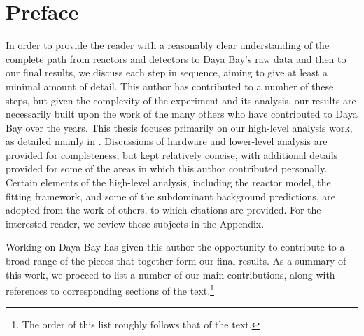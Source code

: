 \chapter*{Preface}

In order to provide the reader with a reasonably clear understanding of the complete path from reactors and detectors to Daya Bay's raw data and then to our final results, we discuss each step in sequence, aiming to give at least a minimal amount of detail. This author has contributed to a number of these steps, but given the complexity of the experiment and its analysis, our results are necessarily built upon the work of the many others who have contributed to Daya Bay over the years. This thesis focuses primarily on our high-level analysis work, as detailed mainly in . Discussions of hardware and lower-level analysis are provided for completeness, but kept relatively concise, with additional details provided for some of the areas in which this author contributed personally. Certain elements of the high-level analysis, including the reactor model, the fitting framework, and some of the subdominant background predictions, are adopted from the work of others, to which citations are provided. For the interested reader, we review these subjects in the Appendix.


Working on Daya Bay has given this author the opportunity to contribute to a broad range of the pieces that together form our final results. As a summary of this work, we proceed to list a number of our main contributions, along with references to corresponding sections of the text.\footnote{The order of this list roughly follows that of the text.}


